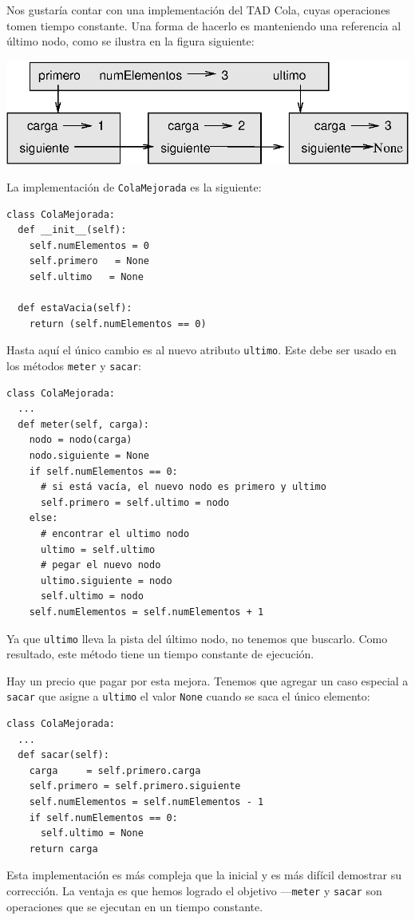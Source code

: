 Nos gustaría contar con una implementación del TAD Cola, cuyas
operaciones tomen tiempo constante.  Una forma de hacerlo 
es manteniendo una referencia al último nodo, como se
ilustra en la figura siguiente:

\beforefig
\centerline{\includegraphics{illustrations/queue1.eps}}
\afterfig

La implementación de \texttt{ColaMejorada} es la siguiente:

\beforeverb
\begin{verbatim}
class ColaMejorada:
  def __init__(self):
    self.numElementos = 0
    self.primero   = None
    self.ultimo   = None

  def estaVacia(self):
    return (self.numElementos == 0)
\end{verbatim}
\afterverb
%
Hasta aquí el único cambio es al nuevo atributo \texttt{ultimo}. Este
debe ser usado en los métodos  \texttt{meter} y \texttt{sacar}:

\beforeverb
\begin{verbatim}
class ColaMejorada:
  ...
  def meter(self, carga):
    nodo = nodo(carga)
    nodo.siguiente = None
    if self.numElementos == 0:
      # si está vacía, el nuevo nodo es primero y ultimo
      self.primero = self.ultimo = nodo
    else:
      # encontrar el ultimo nodo
      ultimo = self.ultimo
      # pegar el nuevo nodo
      ultimo.siguiente = nodo
      self.ultimo = nodo
    self.numElementos = self.numElementos + 1
\end{verbatim}
\afterverb
%
Ya que \texttt{ultimo} lleva la pista del último nodo, no tenemos que
buscarlo. Como resultado, este  método tiene un tiempo constante de 
ejecución.

Hay un precio que pagar por esta mejora. Tenemos que agregar un caso
especial a \texttt{sacar} que asigne a \texttt{ultimo} el valor \texttt{None} 
cuando se saca el único elemento:

\beforeverb
\begin{verbatim}
class ColaMejorada:
  ...
  def sacar(self):
    carga     = self.primero.carga
    self.primero = self.primero.siguiente
    self.numElementos = self.numElementos - 1
    if self.numElementos == 0:
      self.ultimo = None
    return carga
\end{verbatim}
\afterverb
%
Esta implementación es más compleja que la inicial y es más difícil 
demostrar su corrección. La ventaja es que hemos logrado el objetivo
---\texttt{meter} y \texttt{sacar} son operaciones que se ejecutan
en un tiempo constante.


